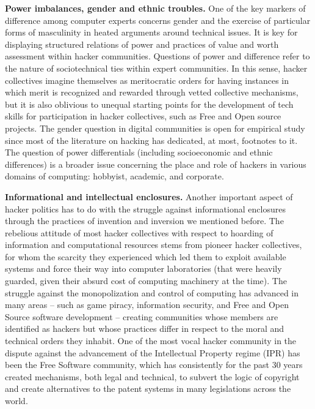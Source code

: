 \documentclass[10pt,letter,oneside]{scrartcl}
\begin{document}
{\bf Power imbalances, gender and ethnic troubles.} One of the key markers of
difference among computer experts concerns gender and the exercise of
particular forms of masculinity in heated arguments around technical issues. It
is key for displaying structured relations of power and practices of value and
worth assessment within hacker communities.  Questions of power and difference
refer to the nature of sociotechnical ties within expert communities. In this
sense, hacker collectives imagine themselves as meritocratic orders for having
instances in which merit is recognized and rewarded through vetted collective
mechanisms, but it is also oblivious to unequal starting points for the
development of tech skills for participation in hacker collectives, such as
Free and Open source projects. The gender question in digital communities is
open for empirical study since most of the literature on hacking has dedicated,
at most, footnotes to it. The question of power differentials (including
socioeconomic and ethnic differences) is a broader issue concerning the place
and role of hackers in various domains of computing: hobbyist, academic, and
corporate.



{\bf Informational and intellectual enclosures.} Another important aspect of
hacker politics has to do with the struggle against informational enclosures
through the practices of invention and inversion we mentioned before. The
rebelious attitude of most hacker collectives with respect to hoarding of
information and computational resources stems from pioneer hacker collectives,
for whom the scarcity they experienced which led them to exploit available
systems and force their way into computer laboratories (that were heavily
guarded, given their absurd cost of computing machinery at the time). The
struggle against the monopolization and control of computing has advanced in
many areas -- such as game piracy, information security, and Free and Open
Source software development -- creating communities whose members are
identified as hackers but whose practices differ in respect to the moral and
technical orders they inhabit. One of the most vocal hacker community in the
dispute against the advancement of the Intellectual Property regime (IPR) has
been the Free Software community, which has consistently for the past 30 years
created mechanisms, both legal and technical, to subvert the logic of copyright
and create alternatives to the patent systems in many legislations across the
world.
\end{document}
